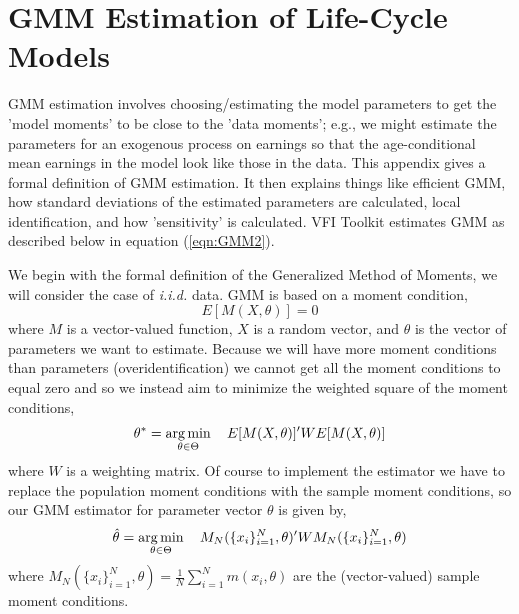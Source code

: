 \section{GMM Estimation of Life-Cycle Models} \label{app:GMMestimation}
GMM estimation involves choosing/estimating the model parameters to get the 'model moments' to be close to the 'data moments'; e.g., we might estimate the parameters for an exogenous process on earnings so that the age-conditional mean earnings in the model look like those in the data. This appendix gives a formal definition of GMM estimation. It then explains things like efficient GMM, how standard deviations of the estimated parameters are calculated, local identification, and how 'sensitivity' is calculated. VFI Toolkit estimates GMM as described below in equation (\ref{eqn:GMM2}).

We begin with the formal definition of the Generalized Method of Moments, we will consider the case of \textit{i.i.d.} data. GMM is based on a moment condition,
\begin{equation*}
 E[M(X, \theta)]=0
\end{equation*}
where $M$ is a vector-valued function, $X$ is a random vector, and $\theta$ is the vector of parameters we want to estimate. Because we will have more moment conditions than parameters (overidentification) we cannot get all the moment conditions to equal zero and so we instead aim to minimize the weighted square of the moment conditions,
\begin{equation} \label{eqn:GMM1}
 \theta^*=\operatorname*{arg\,min}_{\theta \in \Theta} \quad  E[M(X, \theta)]' W E[M(X, \theta)]
\end{equation}
where $W$ is a weighting matrix. Of course to implement the estimator we have to replace the population moment conditions with the sample moment conditions, so our GMM estimator for parameter vector $\theta$ is given by,
\begin{equation*}
 \hat{\theta}=\operatorname*{arg\,min}_{\theta \in \Theta} \quad  M_N(\{x_i\}_{i=1}^N, \theta)' W M_N(\{x_i\}_{i=1}^N, \theta)
\end{equation*}
where $M_N(\{x_i\}_{i=1}^N, \theta)=\frac{1}{N}\sum_{i=1}^N m(x_i,\theta)$ are the (vector-valued) sample moment conditions.

